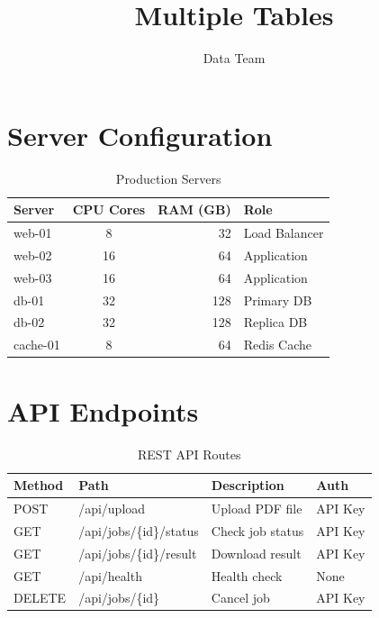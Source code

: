 \documentclass[12pt]{article}
\title{Multiple Tables}
\author{Data Team}
\begin{document}
\maketitle

\section{Server Configuration}
\begin{table}[h]
\centering
\caption{Production Servers}
\begin{tabular}{|l|c|r|l|}
\hline
\textbf{Server} & \textbf{CPU Cores} & \textbf{RAM (GB)} & \textbf{Role} \\
\hline
web-01 & 8 & 32 & Load Balancer \\
web-02 & 16 & 64 & Application \\
web-03 & 16 & 64 & Application \\
db-01 & 32 & 128 & Primary DB \\
db-02 & 32 & 128 & Replica DB \\
cache-01 & 8 & 64 & Redis Cache \\
\hline
\end{tabular}
\end{table}

\section{API Endpoints}
\begin{table}[h]
\centering
\caption{REST API Routes}
\begin{tabular}{|l|l|l|l|}
\hline
\textbf{Method} & \textbf{Path} & \textbf{Description} & \textbf{Auth} \\
\hline
POST & /api/upload & Upload PDF file & API Key \\
GET & /api/jobs/\{id\}/status & Check job status & API Key \\
GET & /api/jobs/\{id\}/result & Download result & API Key \\
GET & /api/health & Health check & None \\
DELETE & /api/jobs/\{id\} & Cancel job & API Key \\
\hline
\end{tabular}
\end{table}
\end{document}
